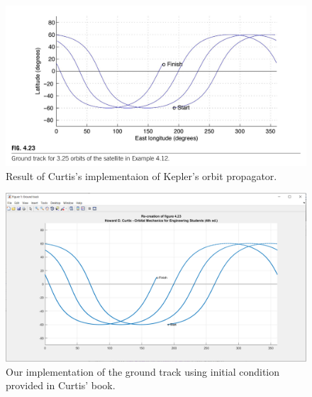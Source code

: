 \documentclass{article}
\begin{document}
\begin{figure}[ht]
  \centering
  \includegraphics[scale=0.25]{assets/curtis_ground_track.png}
  \caption{Result of Curtis's implementaion of Kepler's orbit propagator.}
  \label{fig:curtis_ground_track}
\end{figure}

\begin{figure}[ht]
  \centering
  \includegraphics[scale=0.2]{assets/simdezvous_ground_track.png}
  \caption{Our implementation of the ground track using initial condition provided in Curtis' book.}
  \label{fig:ground_track}
\end{figure}
\end{document}
